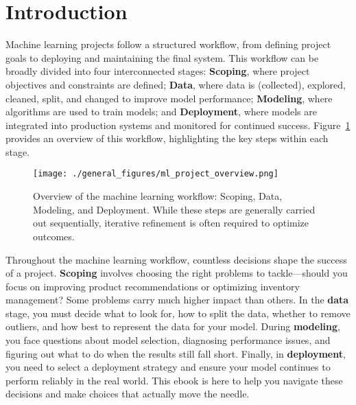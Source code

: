 \documentclass[12pt,openany]{book}
\begin{document}
\section{Introduction}

Machine learning projects follow a structured workflow, from defining project goals to deploying and maintaining the final system. This workflow can be broadly divided into four interconnected stages: \textbf{Scoping}, where project objectives and constraints are defined; \textbf{Data}, where data is (collected), explored, cleaned, split, and changed to improve model performance; \textbf{Modeling}, where algorithms are used to train models; and \textbf{Deployment}, where models are integrated into production systems and monitored for continued success. Figure~\ref{fig:ml_project_overview} provides an overview of this workflow, highlighting the key steps within each stage.

\begin{figure}[H]
    \centering
    \texttt{[image: ./general\_figures/ml\_project\_overview.png]}
    \caption{Overview of the machine learning workflow: Scoping, Data, Modeling, and Deployment. While these steps are generally carried out sequentially, iterative refinement is often required to optimize outcomes.}
    \label{fig:ml_project_overview}
\end{figure}

Throughout the machine learning workflow, countless decisions shape the success of a project. \textbf{Scoping} involves choosing the right problems to tackle—should you focus on improving product recommendations or optimizing inventory management? Some problems carry much higher impact than others. In the \textbf{data} stage, you must decide what to look for, how to split the data, whether to remove outliers, and how best to represent the data for your model. During \textbf{modeling}, you face questions about model selection, diagnosing performance issues, and figuring out what to do when the results still fall short. Finally, in \textbf{deployment}, you need to select a deployment strategy and ensure your model continues to perform reliably in the real world. This ebook is here to help you navigate these decisions and make choices that actually move the needle. 
\newline
\end{document}
